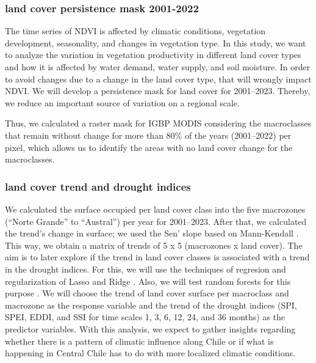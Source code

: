 \documentclass[
  authoryear,
  preprint,
  3p,
  onecolumn]{elsarticle}
\begin{document}
\hypertarget{land-cover-persistence-mask-2001-2022}{%
\subsubsection{land cover persistence mask
2001-2022}\label{land-cover-persistence-mask-2001-2022}}

The time series of NDVI is affected by climatic conditions, vegetation
development, seasonality, and changes in vegetation type. In this study,
we want to analyze the variation in vegetation productivity in different
land cover types and how it is affected by water demand, water supply,
and soil moisture. In order to avoid changes due to a change in the land
cover type, that will wrongly impact NDVI. We will develop a persistence
mask for land cover for 2001--2023. Thereby, we reduce an important
source of variation on a regional scale.

Thus, we calculated a raster mask for IGBP MODIS considering the
macroclasses that remain without change for more than 80\% of the years
(2001--2022) per pixel, which allows us to identify the areas with no
land cover change for the macroclasses.

\hypertarget{land-cover-trend-and-drought-indices}{%
\subsubsection{land cover trend and drought
indices}\label{land-cover-trend-and-drought-indices}}

We calculated the surface occupied per land cover class into the five
macrozones (``Norte Grande'' to ``Austral'') per year for 2001--2023.
After that, we calculated the trend's change in surface; we used the
Sen' slope \citep{Sen1968} based on Mann-Kendall \citep{Kendall1975}.
This way, we obtain a matrix of trends of 5 x 5 (macrozones x land
cover). The aim is to later explore if the trend in land cover classes
is associated with a trend in the drought indices. For this, we will use
the techniques of regresion and regularization of Lasso
\citep{Tibshirani2010} and Ridge \citep{Hoerl1970}. Also, we will test
random forests for this purpose \citep{Ho1995}. We will choose the trend
of land cover surface per macroclass and macrozone as the response
variable and the trend of the drought indices (SPI, SPEI, EDDI, and SSI
for time scales 1, 3, 6, 12, 24, and 36 months) as the predictor
variables. With this analysis, we expect to gather insights regarding
whether there is a pattern of climatic influence along Chile or if what
is happening in Central Chile has to do with more localized climatic
conditions.
\end{document}
